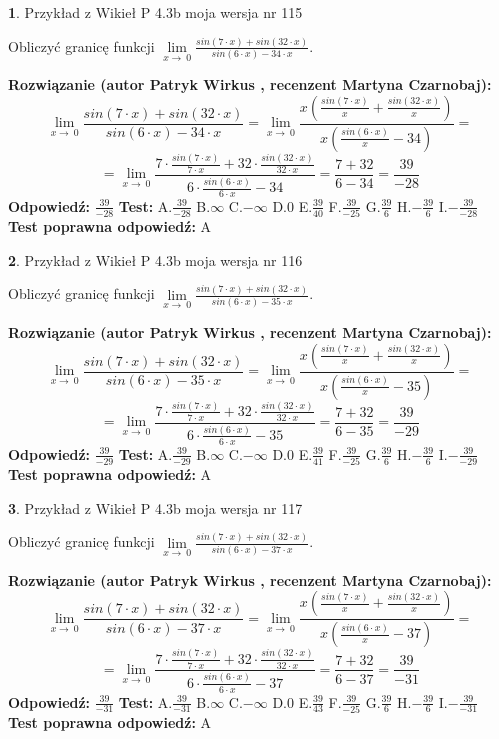 \documentclass[12pt, a4paper]{article}
\theoremstyle{definition} %
\newtheorem{zad}{}
\newcommand{\zadStart}[1]{\begin{zad}#1\newline}
\newcommand{\zadStop}{\end{zad}}
\newcommand{\rozwStart}[2]{\noindent \textbf{Rozwiązanie (autor #1 , recenzent #2): }\newline}
\newcommand{\rozwStop}{\newline}
\newcommand{\odpStart}{\noindent \textbf{Odpowiedź:}\newline}
\newcommand{\odpStop}{\newline}
\newcommand{\testStart}{\noindent \textbf{Test:}\newline}
\newcommand{\testStop}{\newline}
\newcommand{\kluczStart}{\noindent \textbf{Test poprawna odpowiedź:}\newline}
\newcommand{\kluczStop}{\newline}
\begin{document}
\zadStart{Przykład z Wikieł P 4.3b moja wersja nr 115}


Obliczyć granicę funkcji $\lim\limits_{x\to\ 0}\frac{sin(7 \cdot x)+sin(32 \cdot x)}{sin(6 \cdot x)-34 \cdot x}$.
\zadStop
\rozwStart{Patryk Wirkus}{Martyna Czarnobaj}
$$\lim\limits_{x\to\ 0}\frac{sin(7 \cdot x)+sin(32 \cdot x)}{sin(6 \cdot x)-34 \cdot x}=\lim\limits_{x\to\ 0}\frac{x(\frac{sin(7 \cdot x)}{x}+\frac{sin(32 \cdot x)}{x})}{x(\frac{sin(6 \cdot x)}{x}-34)}=$$
$$=\lim\limits_{x\to\ 0}\frac{7 \cdot \frac{sin(7 \cdot x)}{7 \cdot x}+32 \cdot \frac{sin(32 \cdot x)}{32 \cdot x}}{6 \cdot \frac{sin(6 \cdot x)}{6 \cdot x}-34}=\frac{7+32}{6-34} = \frac{39}{-28}$$
\rozwStop
\odpStart
$\frac{39}{-28}$
\odpStop
\testStart
A.$\frac{39}{-28}$
B.$\infty$
C.$-\infty$
D.$0$
E.$\frac{39}{40}$
F.$\frac{39}{-25}$
G.$\frac{39}{6}$
H.$-\frac{39}{6}$
I.$-\frac{39}{-28}$
\testStop
\kluczStart
A
\kluczStop



\zadStart{Przykład z Wikieł P 4.3b moja wersja nr 116}


Obliczyć granicę funkcji $\lim\limits_{x\to\ 0}\frac{sin(7 \cdot x)+sin(32 \cdot x)}{sin(6 \cdot x)-35 \cdot x}$.
\zadStop
\rozwStart{Patryk Wirkus}{Martyna Czarnobaj}
$$\lim\limits_{x\to\ 0}\frac{sin(7 \cdot x)+sin(32 \cdot x)}{sin(6 \cdot x)-35 \cdot x}=\lim\limits_{x\to\ 0}\frac{x(\frac{sin(7 \cdot x)}{x}+\frac{sin(32 \cdot x)}{x})}{x(\frac{sin(6 \cdot x)}{x}-35)}=$$
$$=\lim\limits_{x\to\ 0}\frac{7 \cdot \frac{sin(7 \cdot x)}{7 \cdot x}+32 \cdot \frac{sin(32 \cdot x)}{32 \cdot x}}{6 \cdot \frac{sin(6 \cdot x)}{6 \cdot x}-35}=\frac{7+32}{6-35} = \frac{39}{-29}$$
\rozwStop
\odpStart
$\frac{39}{-29}$
\odpStop
\testStart
A.$\frac{39}{-29}$
B.$\infty$
C.$-\infty$
D.$0$
E.$\frac{39}{41}$
F.$\frac{39}{-25}$
G.$\frac{39}{6}$
H.$-\frac{39}{6}$
I.$-\frac{39}{-29}$
\testStop
\kluczStart
A
\kluczStop



\zadStart{Przykład z Wikieł P 4.3b moja wersja nr 117}


Obliczyć granicę funkcji $\lim\limits_{x\to\ 0}\frac{sin(7 \cdot x)+sin(32 \cdot x)}{sin(6 \cdot x)-37 \cdot x}$.
\zadStop
\rozwStart{Patryk Wirkus}{Martyna Czarnobaj}
$$\lim\limits_{x\to\ 0}\frac{sin(7 \cdot x)+sin(32 \cdot x)}{sin(6 \cdot x)-37 \cdot x}=\lim\limits_{x\to\ 0}\frac{x(\frac{sin(7 \cdot x)}{x}+\frac{sin(32 \cdot x)}{x})}{x(\frac{sin(6 \cdot x)}{x}-37)}=$$
$$=\lim\limits_{x\to\ 0}\frac{7 \cdot \frac{sin(7 \cdot x)}{7 \cdot x}+32 \cdot \frac{sin(32 \cdot x)}{32 \cdot x}}{6 \cdot \frac{sin(6 \cdot x)}{6 \cdot x}-37}=\frac{7+32}{6-37} = \frac{39}{-31}$$
\rozwStop
\odpStart
$\frac{39}{-31}$
\odpStop
\testStart
A.$\frac{39}{-31}$
B.$\infty$
C.$-\infty$
D.$0$
E.$\frac{39}{43}$
F.$\frac{39}{-25}$
G.$\frac{39}{6}$
H.$-\frac{39}{6}$
I.$-\frac{39}{-31}$
\testStop
\kluczStart
A
\kluczStop
\end{document}
